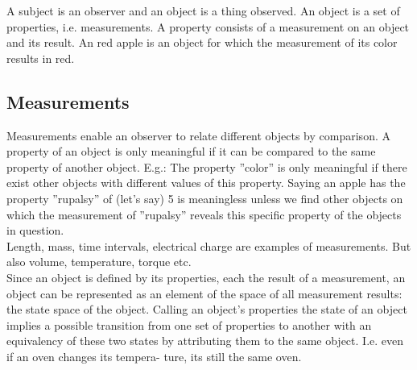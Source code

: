 A subject is an observer and an object is a thing observed. An object is a set of properties, i.e. measurements. A property consists of a measurement on an object and its result. An red apple is an object for which the measurement of its color results in red.
\subsection{Measurements}
Measurements enable an observer to relate different objects by comparison. A property of an object is only meaningful if it can be compared to the same property of another object. E.g.: The property ”color” is only meaningful if there exist other objects with different values of this property. Saying an apple has the property ”rupalsy” of (let’s say) 5 is meaningless unless we find other objects on which the measurement of ”rupalsy” reveals this specific property of the objects in question.\\
Length, mass, time intervals, electrical charge are examples of measurements. But also volume, temperature, torque etc.\\
Since an object is defined by its properties, each the result of a measurement, an object can be represented as an element of the space of all measurement results: the state space of the object.
Calling an object’s properties the state of an object implies a possible transition from one set of properties to another with an equivalency of these two states by attributing them to the same object. I.e. even if an oven changes its tempera- ture, its still the same oven.
